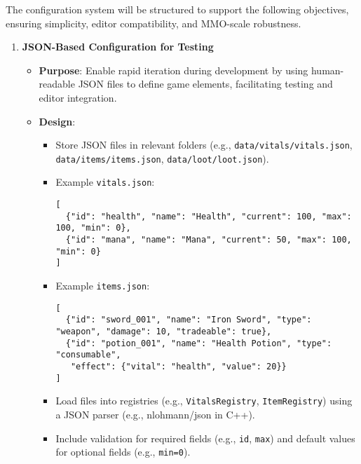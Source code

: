 The configuration system will be structured to support the following objectives, ensuring simplicity, editor compatibility, and MMO-scale robustness.

\begin{enumerate}
    \item \textbf{JSON-Based Configuration for Testing}
        \begin{itemize}
            \item \textbf{Purpose}: Enable rapid iteration during development by using human-readable JSON files to define game elements, facilitating testing and editor integration.
            \item \textbf{Design}:
                \begin{itemize}
                    \item Store JSON files in relevant folders (e.g., \texttt{data/vitals/vitals.json}, \texttt{data/items/items.json}, \texttt{data/loot/loot.json}).
                    \item Example \texttt{vitals.json}:
                    \begin{lstlisting}[style=htmlstyle]
[
  {"id": "health", "name": "Health", "current": 100, "max": 100, "min": 0},
  {"id": "mana", "name": "Mana", "current": 50, "max": 100, "min": 0}
]
                    \end{lstlisting}
                    \item Example \texttt{items.json}:
                    \begin{lstlisting}[style=htmlstyle]
[
  {"id": "sword_001", "name": "Iron Sword", "type": "weapon", "damage": 10, "tradeable": true},
  {"id": "potion_001", "name": "Health Potion", "type": "consumable", 
   "effect": {"vital": "health", "value": 20}}
]
                    \end{lstlisting}
                    \item Load files into registries (e.g., \texttt{VitalsRegistry}, \texttt{ItemRegistry}) using a JSON parser (e.g., nlohmann/json in C++).
                    \item Include validation for required fields (e.g., \texttt{id}, \texttt{max}) and default values for optional fields (e.g., \texttt{min=0}).
                \end{itemize}
        \end{itemize}


\end{enumerate}
